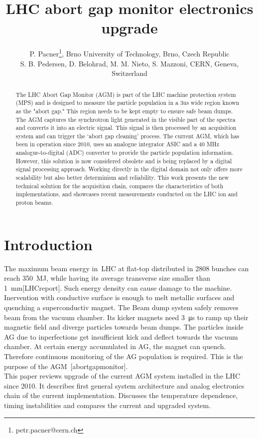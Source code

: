 



\title{LHC abort gap monitor electronics upgrade}

\author{P. Pacner\thanks{petr.pacner@cern.ch}, Brno University of Technology, Brno, Czech Republic \\
		S. B. Pedersen, D. Belohrad, M. M. Nieto, S. Mazzoni, CERN, Geneva, Switzerland}
	
\maketitle

\begin{abstract}
    The LHC Abort Gap Monitor (AGM) is part of the LHC machine protection
    system (MPS) and is designed to measure the particle population in a 3us
    wide region known as the "abort gap." This region needs to be kept empty to
    ensure safe beam dumps. The AGM captures the synchrotron light generated in
    the visible part of the spectra and converts it into an electric signal.
    This signal is then processed by an acquisition system and can trigger the
    ‘abort gap cleaning’ process. The current AGM, which has been in operation
    since 2010, uses an analogue integrator ASIC and a 40 MHz
    analogue-to-digital (ADC) converter to provide the particle population
    information. However, this solution is now considered obsolete and is being
    replaced by a digital signal processing approach. Working directly in the
    digital domain not only offers more scalability but also better determinism
    and reliability. This work presents the new technical solution for the
    acquisition chain, compares the characteristics of both implementations,
    and showcases recent measurements conducted on the LHC ion and proton
    beams.
\end{abstract}

\section{Introduction}
The maximum beam energy in~LHC at flat-top distributed in 2808 bunches can
reach \SI{350}{MJ}, while having its average transverse size smaller than
\SI{1}{mm}[LHCreport]. Such energy density can cause damage to the machine. 
Inervention with conductive surface is enough to melt metallic surfaces and
quenching a superconductiv magnet. The Beam dump system safely removes beam
from the vacuum chamber. Its kicker magnets need \SI{3}{\micro\second} to ramp
up their magnetic field and diverge particles towards beam dumps. The particles
inside AG due to inperfections get insufficient kick and deflect towards the
vacuum chamber. At certain energy accumulated in AG, the magnet can quench.
Therefore continuous monitoring of the AG population is required. This is the
purpose of the AGM~[abortgapmonitor].\\ 
This paper reviews upgrade of the current AGM system installed in the LHC since
2010. It describes first general system architecture and analog electronics
chain of the current implementation. Discusses the temperature dependence,
timing instabilities and compares the current and upgraded system. 

